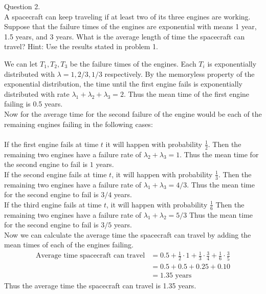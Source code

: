 \documentclass[answers,12pt,addpoints]{exam}
\begin{document}
\begin{questions}
    \question Question 2.\\
    A spacecraft can keep traveling if at least two of its three engines are working. Suppose that the failure times of the engines are exponential with means 1 year, 1.5 years, and 3 years. What is the average length of time the spacecraft can travel? Hint: Use the results stated in problem 1.
    \begin{solution}
        We can let \(T_1, T_2, T_3\) be the failure times of the engines. Each $T_i$ is exponentially distributed with \(\lambda = 1, 2/3, 1/3\) respectively.
        By the memoryless property of the exponential distribution, the time until the first engine fails is exponentially distributed with rate \(\lambda_1 + \lambda_2 + \lambda_3 = 2\). Thus the mean time of the first engine failing is 0.5 years.\\ 
        Now for the average time for the second failure of the engine would be each of the remaining engines failing in the following cases: \\\\
        If the first engine fails at time \(t\) it will happen with probability \(\frac{1}{2}\). Then the remaining two engines have a failure rate of \(\lambda_2 + \lambda_3 = 1\). Thus the mean time for the second engine to fail is \(1\) years.\\
        If the second engine fails at time \(t\), it will happen with probability \(\frac{1}{3}\). Then the remaining two engines have a failure rate of \(\lambda_1 + \lambda_3 = 4/3\). Thus the mean time for the second engine to fail is \(3/4\) years.\\
        If the third engine fails at time \(t\), it will happen with probability \(\frac{1}{6}\) Then the remaining two engines have a failure rate of \(\lambda_1 + \lambda_2  = 5/3 \) Thus the mean time for the second engine to fail is \(3/5\) years.\\
        Now we can calculate the average time the spacecraft can travel by adding the mean times of each of the engines failing.
        \begin{align*}
            \text{Average time spacecraft can travel} &= 0.5 + \frac{1}{2} \cdot 1 + \frac{1}{3} \cdot \frac{3}{4} + \frac{1}{6} \cdot \frac{3}{5}\\
            &= 0.5 + 0.5 + 0.25 + 0.10\\
            &= 1.35 \text{ years}
        \end{align*}
        Thus the average time the spacecraft can travel is 1.35 years.
    \end{solution}


\end{questions}
\end{document}
